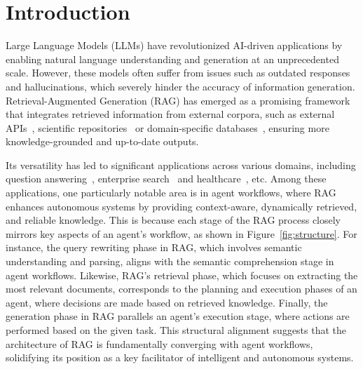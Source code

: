\section{Introduction}
Large Language Models (LLMs) have revolutionized AI-driven applications by enabling natural language understanding and generation at an unprecedented scale. However, these models often suffer from issues such as outdated responses and hallucinations, which severely hinder the accuracy of information generation. 
Retrieval-Augmented Generation (RAG) has emerged as a promising framework that integrates retrieved information from external corpora, such as external APIs~\cite{google,bing}, scientific repositories~\cite{arxiv,pubmed} or domain-specific databases~\cite{amazon_dataset, espn_dataset}, ensuring more knowledge-grounded and up-to-date outputs. 

Its versatility has led to significant applications across various domains, including question answering~\cite{siriwardhana2023improving}, enterprise search~\cite{bulfamante2023generative} and healthcare~\cite{wu2024medical}, etc. Among these applications, one particularly notable area is in agent workflows, where RAG enhances autonomous systems by providing context-aware, dynamically retrieved, and reliable knowledge. This is because each stage of the RAG process closely mirrors key aspects of an agent’s workflow, as shown in Figure~\ref{fig:structure}. For instance, the query rewriting phase in RAG, which involves semantic understanding and parsing, aligns with the semantic comprehension stage in agent workflows. Likewise, RAG’s retrieval phase, which focuses on extracting the most relevant documents, corresponds to the planning and execution phases of an agent, where decisions are made based on retrieved knowledge. Finally, the generation phase in RAG parallels an agent’s execution stage, where actions are performed based on the given task. This structural alignment suggests that the architecture of RAG is fundamentally converging with agent workflows, solidifying its position as a key facilitator of intelligent and autonomous systems.

